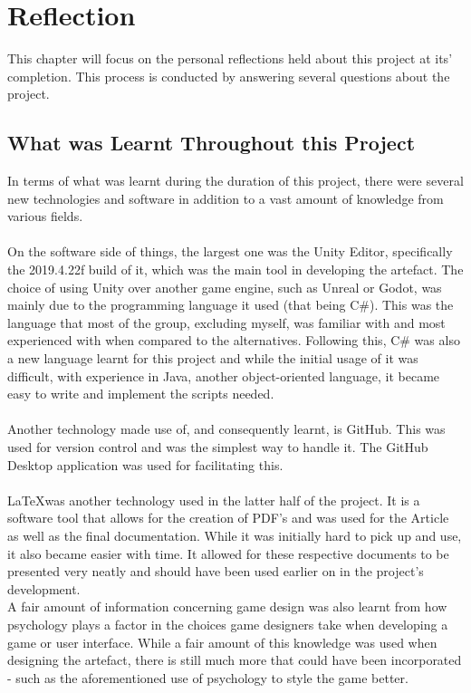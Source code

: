 
\chapter{Reflection} %

\label{Chapter5} %
This chapter will focus on the personal reflections held about this project at its' completion. This process is conducted by answering several questions about the project.

\section{What was Learnt Throughout this Project}
In terms of what was learnt during the duration of this project, there were several new technologies and software in addition to a vast amount of knowledge from various fields.
\\\\
On the software side of things, the largest one was the Unity Editor, specifically the 2019.4.22f build of it, which was the main tool in developing the artefact. The choice of using Unity over another game engine, such as Unreal or Godot, was mainly due to the programming language it used (that being C\#). This was the language that most of the group, excluding myself, was familiar with and most experienced with when compared to the alternatives. Following this, C\# was also a new language learnt for this project and while the initial usage of it was difficult, with experience in Java, another object-oriented language, it became easy to write and implement the scripts needed. 
\\\\
Another technology made use of, and consequently learnt, is GitHub. This was used for version control and was the simplest way to handle it. The GitHub Desktop application was used for facilitating this. 
\\\\
\LaTeX was another technology used in the latter half of the project. It is a software tool that allows for the creation of PDF's and was used for the Article as well as the final documentation. While it was initially hard to pick up and use, it also became easier with time. It allowed for these respective documents to be presented very neatly and should have been used earlier on in the project's development. 
\\
A fair amount of information concerning game design was also learnt from how psychology plays a factor in the choices game designers take when developing a game or user interface. While a fair amount of this knowledge was used when designing the artefact, there is still much more that could have been incorporated - such as the aforementioned use of psychology to style the game better.
